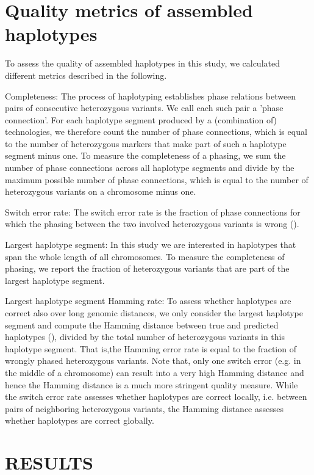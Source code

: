 
\section{Quality metrics of assembled haplotypes}
	To assess the quality of assembled haplotypes in this study, we calculated different metrics described in the following.
	
Completeness: The process of haplotyping establishes phase relations between pairs of consecutive heterozygous variants. We call each such pair a 'phase connection'. For each haplotype segment produced by a (combination of) technologies, we therefore count the number of phase connections, which is equal to the number of heterozygous markers that make part of such a haplotype segment minus one. 
To measure the completeness of a phasing, we sum the number of phase connections across all haplotype segments and divide by the maximum possible number of phase connections, which is equal to the number of heterozygous variants on a chromosome minus one.

Switch error rate: The switch error rate is the fraction of phase connections for which the phasing between the two involved heterozygous variants is wrong ().

Largest haplotype segment: In this study we are interested in haplotypes that span the whole length of all chromosomes. To measure the completeness of phasing, we report the fraction of heterozygous variants that are part of the largest haplotype segment.

Largest haplotype segment Hamming rate: To assess whether haplotypes are correct also over long genomic distances, we only consider the largest haplotype segment and compute the Hamming distance between true and predicted haplotypes (),
divided by the total number of heterozygous variants in this haplotype segment. 
That is,the Hamming error rate is equal to the fraction of wrongly phased heterozygous variants. 
Note that, only one switch error (e.g. in the middle of a chromosome) can result  into a very high Hamming distance and hence the Hamming distance is a much more stringent quality measure. 
While the switch error rate assesses whether haplotypes are correct locally, i.e. between pairs of neighboring heterozygous variants, the Hamming distance assesses whether haplotypes are correct globally.


\section{RESULTS}

